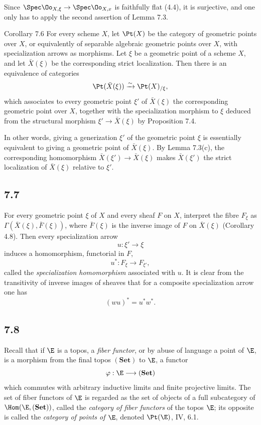 Since \(\Spec\Oo_{X,\xi}\to\Spec\Oo_{X,x}\) is faithfully flat (4.4), it is surjective, and one only has to apply the second assertion of Lemma 7.3.

\begin{statement}{Corollary 7.6}
For every scheme \(X\), let \(\Pt(X)\) be the category of geometric points over \(X\), or equivalently of separable algebraic geometric points over \(X\), with specialization arrows as morphisms. Let \(\xi\) be a geometric point of a scheme \(X\), and let \(\bar X(\xi)\) be the corresponding strict localization. Then there is an equivalence of categories
\[
\Pt(\bar X(\xi))\xrightarrow{\sim}\Pt(X)_{/\xi},
\]
which associates to every geometric point \(\xi'\) of \(\bar X(\xi)\) the corresponding geometric point over \(X\), together with the specialization morphism to \(\xi\) deduced from the structural morphism \(\xi'\to\bar X(\xi)\) by Proposition 7.4.
\end{statement}

In other words, giving a generization \(\xi'\) of the geometric point \(\xi\) is essentially equivalent to giving a geometric point of \(\bar X(\xi)\). By Lemma 7.3(c), the corresponding homomorphism \(\bar X(\xi')\to\bar X(\xi)\) makes \(\bar X(\xi')\) the strict localization of \(\bar X(\xi)\) relative to \(\xi'\).

\subsection*{7.7}
For every geometric point \(\xi\) of \(X\) and every sheaf \(F\) on \(X\), interpret the fibre \(F_\xi\) as \(\Gamma(\bar X(\xi),\bar F(\xi))\), where \(\bar F(\xi)\) is the inverse image of \(F\) on \(\bar X(\xi)\) (Corollary 4.8). Then every specialization arrow
\[
u:\xi'\longrightarrow \xi
\]
induces a homomorphism, functorial in \(F\),
\[
u^*:F_\xi\longrightarrow F_{\xi'},
\]
called the \emph{specialization homomorphism} associated with \(u\). It is clear from the transitivity of inverse images of sheaves that for a composite specialization arrow one has
\[
(wu)^*=u^*w^*.
\]

\subsection*{7.8}
Recall that if \(\E\) is a topos, a \emph{fiber functor}, or by abuse of language a point of \(\E\), is a morphism from the final topos \((\mathbf{Set})\) to \(\E\), \ie a functor
\[
\varphi:\E\longrightarrow (\mathbf{Set})
\]
which commutes with arbitrary inductive limits and finite projective limits. The set of fiber functors of \(\E\) is regarded as the set of objects of a full subcategory of \(\Hom(\E,(\mathbf{Set}))\), called the \emph{category of fiber functors} of the topos \(\E\); its opposite is called the \emph{category of points of \(\E\)}, denoted \(\Pt(\E)\), \cf IV, 6.1.

